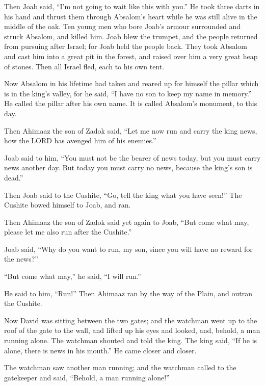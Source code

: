  Then Joab said, ``I'm not going to wait like this with
you.'' He took three darts in his hand and thrust them through Absalom's
heart while he was still alive in the middle of the oak. 
Ten young men who bore Joab's armour surrounded and struck Absalom, and
killed him.  Joab blew the trumpet, and the people
returned from pursuing after Israel; for Joab held the people back.
 They took Absalom and cast him into a great pit in the
forest, and raised over him a very great heap of stones. Then all Israel
fled, each to his own tent.

 Now Absalom in his lifetime had taken and reared up for
himself the pillar which is in the king's valley, for he said, ``I have
no son to keep my name in memory.'' He called the pillar after his own
name. It is called Absalom's monument, to this day.

 Then Ahimaaz the son of Zadok said, ``Let me now run and
carry the king news, how the LORD has avenged him of his enemies.''

 Joab said to him, ``You must not be the bearer of news
today, but you must carry news another day. But today you must carry no
news, because the king's son is dead.''

 Then Joab said to the Cushite, ``Go, tell the king what
you have seen!'' The Cushite bowed himself to Joab, and ran.

 Then Ahimaaz the son of Zadok said yet again to Joab,
``But come what may, please let me also run after the Cushite.''

Joab said, ``Why do you want to run, my son, since you will have no
reward for the news?''

 ``But come what may,'' he said, ``I will run.''

He said to him, ``Run!'' Then Ahimaaz ran by the way of the Plain, and
outran the Cushite.

 Now David was sitting between the two gates; and the
watchman went up to the roof of the gate to the wall, and lifted up his
eyes and looked, and, behold, a man running alone.  The
watchman shouted and told the king. The king said, ``If he is alone,
there is news in his mouth.'' He came closer and closer.

 The watchman saw another man running; and the watchman
called to the gatekeeper and said, ``Behold, a man running alone!''

